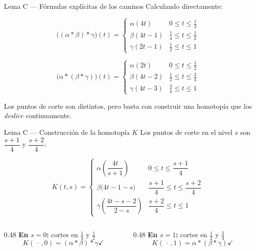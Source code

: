 \begin{frame}{Lema C — Fórmulas explícitas de los caminos}
  Calculando directamente:

  \[
    \bigl((\alpha*\beta)*\gamma\bigr)(t) =
    \begin{cases}
      \alpha(4t)   & 0 \le t \le \tfrac{1}{4} \\[3pt]
      \beta(4t-1)  & \tfrac{1}{4} \le t \le \tfrac{1}{2} \\[3pt]
      \gamma(2t-1) & \tfrac{1}{2} \le t \le 1
    \end{cases}
  \]

  \bigskip

  \[
    \bigl(\alpha*(\beta*\gamma)\bigr)(t) =
    \begin{cases}
      \alpha(2t)   & 0 \le t \le \tfrac{1}{2} \\[3pt]
      \beta(4t-2)  & \tfrac{1}{2} \le t \le \tfrac{3}{4} \\[3pt]
      \gamma(4t-3) & \tfrac{3}{4} \le t \le 1
    \end{cases}
  \]

  \bigskip
  Los puntos de corte son distintos, pero basta con construir una homotopía
  que los \emph{deslice} continuamente.
\end{frame}

\begin{frame}{Lema C — Construcción de la homotopía $K$}
  Los puntos de corte en el nivel $s$ son $\dfrac{s+1}{4}$ y $\dfrac{s+2}{4}$:

  \[
    \boxed{K(t,s) =
    \begin{cases}
      \alpha\!\left(\dfrac{4t}{s+1}\right)
        & 0 \le t \le \dfrac{s+1}{4} \\[10pt]
      \beta\bigl(4t - 1 - s\bigr)
        & \dfrac{s+1}{4} \le t \le \dfrac{s+2}{4} \\[10pt]
      \gamma\!\left(\dfrac{4t - s - 2}{2 - s}\right)
        & \dfrac{s+2}{4} \le t \le 1
    \end{cases}}
  \]

  \begin{columns}[T]
    \begin{column}{0.48\textwidth}
      \textbf{En $s=0$:} cortes en $\tfrac{1}{4}$ y $\tfrac{1}{2}$
      \[K(\,\cdot\,,0) = (\alpha*\beta)*\gamma \checkmark\]
    \end{column}
    \begin{column}{0.48\textwidth}
      \textbf{En $s=1$:} cortes en $\tfrac{1}{2}$ y $\tfrac{3}{4}$
      \[K(\,\cdot\,,1) = \alpha*(\beta*\gamma) \checkmark\]
    \end{column}
  \end{columns}
\end{frame}

